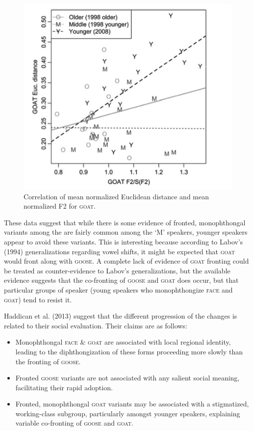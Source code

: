 \documentclass{article}
\begin{document}
\begin{figure}[ht!]
\centering
\includegraphics[scale=0.6]{goat_correlation.png}
\caption{Correlation of mean normalized Euclidean distance and  mean normalized F2 for \textsc{goat}.}
\end{figure}

These data suggest that while there is some evidence of fronted, monophthongal variants among the are fairly common among the `M' speakers, younger speakers appear to avoid these variants. This is interesting because according to Labov's (1994) generalizations regarding vowel shifts, it might be expected that \textsc{goat} would front along with \textsc{goose}. A complete lack of evidence of \textsc{goat} fronting could be treated as counter-evidence to Labov's generalizations, but the available evidence suggests that the co-fronting of \textsc{goose} and \textsc{goat} does occur, but that particular groups of speaker (young speakers who monophthongize \textsc{face} and \textsc{goat}) tend to resist it.  

Haddican et al. (2013) suggest that the different progression of the changes is related to their social evaluation. Their claims are as follows:

\begin{itemize}
\item{Monophthongal \textsc{face} \& \textsc{goat} are associated with local regional identity, leading to the diphthongization of these forms proceeding more slowly than the fronting of \textsc{goose}.}
\item{Fronted \textsc{goose} variants are not associated with any salient social meaning, facilitating their rapid adoption.}
\item{Fronted, monophthongal \textsc{goat} variants may be associated with a stigmatized, working-class subgroup, particularly amongst younger speakers, explaining variable co-fronting of \textsc{goose} and \textsc{goat}.}
\end{itemize}
\end{document}
